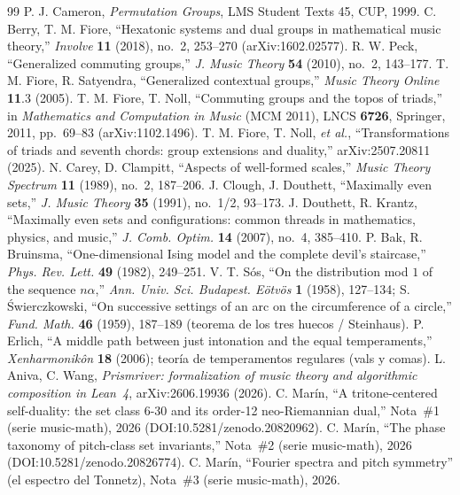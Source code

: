 \documentclass[11pt]{article}
\begin{document}
\begin{thebibliography}{99}
 P. J. Cameron, \emph{Permutation Groups}, LMS Student Texts 45, CUP, 1999.
 C. Berry, T. M. Fiore, ``Hexatonic systems and dual groups in mathematical music
  theory,'' \emph{Involve} \textbf{11} (2018), no.~2, 253--270 (arXiv:1602.02577).
 R. W. Peck, ``Generalized commuting groups,'' \emph{J. Music Theory} \textbf{54}
  (2010), no.~2, 143--177.
 T. M. Fiore, R. Satyendra, ``Generalized contextual groups,'' \emph{Music Theory
  Online} \textbf{11}.3 (2005).
 T. M. Fiore, T. Noll, ``Commuting groups and the topos of triads,'' in
  \emph{Mathematics and Computation in Music} (MCM 2011), LNCS \textbf{6726}, Springer, 2011,
  pp.~69--83 (arXiv:1102.1496).
 T. M. Fiore, T. Noll, \emph{et al.}, ``Transformations of triads and seventh
  chords: group extensions and duality,'' arXiv:2507.20811 (2025).
 N. Carey, D. Clampitt, ``Aspects of well-formed scales,'' \emph{Music
  Theory Spectrum} \textbf{11} (1989), no.~2, 187--206.
 J. Clough, J. Douthett, ``Maximally even sets,'' \emph{J. Music Theory}
  \textbf{35} (1991), no.~1/2, 93--173.
 J. Douthett, R. Krantz, ``Maximally even sets and configurations: common
  threads in mathematics, physics, and music,'' \emph{J. Comb. Optim.} \textbf{14} (2007), no.~4,
  385--410.
 P. Bak, R. Bruinsma, ``One-dimensional Ising model and the complete devil's
  staircase,'' \emph{Phys. Rev. Lett.} \textbf{49} (1982), 249--251.
 V. T. S\'os, ``On the distribution mod $1$ of the sequence $n\alpha$,''
  \emph{Ann. Univ. Sci. Budapest. E\"otv\"os} \textbf{1} (1958), 127--134; S. \'Swierczkowski,
  ``On successive settings of an arc on the circumference of a circle,'' \emph{Fund. Math.}
  \textbf{46} (1959), 187--189 (teorema de los tres huecos / Steinhaus).
 P. Erlich, ``A middle path between just intonation and the equal temperaments,''
  \emph{Xenharmonik\^on} \textbf{18} (2006); teoría de temperamentos regulares (vals y comas).
 L. Aniva, C. Wang, \emph{Prismriver: formalization of music theory and
  algorithmic composition in Lean~4}, arXiv:2606.19936 (2026).
 C. Mar\'in, ``A tritone-centered self-duality: the set class 6-30 and its
  order-12 neo-Riemannian dual,'' Nota~\#1 (serie music-math), 2026
  (DOI:10.5281/zenodo.20820962).
 C. Mar\'in, ``The phase taxonomy of pitch-class set invariants,'' Nota~\#2
  (serie music-math), 2026 (DOI:10.5281/zenodo.20826774).
 C. Mar\'in, ``Fourier spectra and pitch symmetry'' (el espectro del Tonnetz),
  Nota~\#3 (serie music-math), 2026.
\end{thebibliography}
\end{document}
